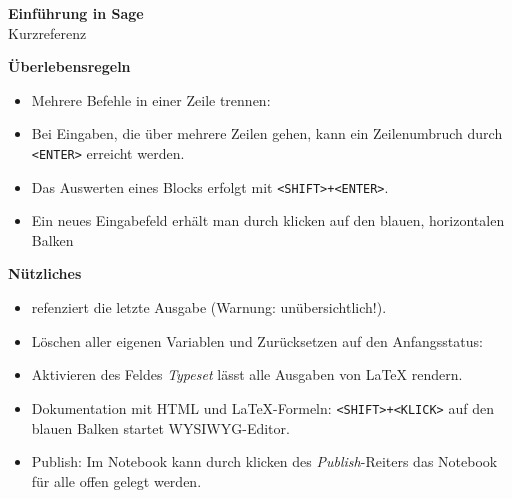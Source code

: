 \documentclass[a4paper,9pt,DIV15,twocolumn]{scrartcl}
\begin{document}
\begin{center}
        \textbf{\LARGE Einf\"uhrung in Sage}\\
        {\large Kurzreferenz}
\end{center}


\textbf{Überlebensregeln}
\begin{itemize}
\item Mehrere Befehle in einer Zeile trennen: {\color{blue}\isage{;}}
\item Bei Eingaben, die über mehrere Zeilen gehen, kann ein
  Zeilenumbruch durch {\color{blue} \verb~<ENTER>~} erreicht werden.
\item Das Auswerten eines Blocks erfolgt mit {\color{blue} \verb~<SHIFT>+<ENTER>~}.
\item Ein neues Eingabefeld erhält man durch klicken auf den blauen, horizontalen Balken
\end{itemize}
\textbf{Nützliches}
\begin{itemize}
\item {\color{blue} \isage{_} } refenziert die letzte Ausgabe (Warnung: unübersichtlich!).
\item Löschen aller eigenen Variablen und Zurücksetzen auf den Anfangsstatus: {\color{blue} }
\item Aktivieren des Feldes \emph{Typeset} lässt alle Ausgaben von \LaTeX{} rendern.
\item Dokumentation mit HTML und \LaTeX{}-Formeln:{\color{blue} \verb~<SHIFT>+<KLICK>~ }auf den blauen Balken startet WYSIWYG-Editor.
\item Publish: Im Notebook kann durch klicken des \emph{Publish}-Reiters das Notebook für alle offen gelegt werden. 
\end{itemize}
\end{document}
